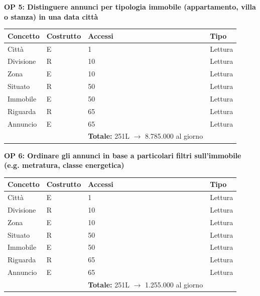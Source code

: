 \documentclass[a4paper,12pt]{report}
\begin{document}
            \textbf{OP 5: Distinguere annunci per tipologia immobile (appartamento, villa o stanza) in una data città}
        	\begin{table}[H]
            \centering
             \begin{tabular}{llll}
             \rowcolor{yellow!20} \textbf{Concetto} & \textbf{Costrutto} & \textbf{Accessi} & \textbf{Tipo}\\ [0.5ex] 
             \hline
             Città & E & 1 & Lettura \\ 
             Divisione & R & 10 & Lettura \\ 
             Zona & E & 10 & Lettura \\ 
             Situato & R & 50 & Lettura \\ 
             Immobile & E & 50 & Lettura \\
             Riguarda & R & 65 & Lettura \\ 
             Annuncio & E & 65 & Lettura \\ 
             \hline
                \rowcolor{yellow!20} &   & \textbf{Totale:} 251L $\rightarrow$ 8.785.000 al giorno &  \\ [1ex] 
             
             \end{tabular}
            \end{table}

            \textbf{OP 6: Ordinare gli annunci in base a particolari filtri sull'immobile (e.g. metratura, classe energetica)}
        	\begin{table}[H]
            \centering
             \begin{tabular}{llll}
             \rowcolor{yellow!20} \textbf{Concetto} & \textbf{Costrutto} & \textbf{Accessi} & \textbf{Tipo}\\ [0.5ex] 
             \hline
             Città & E & 1 & Lettura \\ 
             Divisione & R & 10 & Lettura \\ 
             Zona & E & 10 & Lettura \\ 
             Situato & R & 50 & Lettura \\ 
             Immobile & E & 50 & Lettura \\
             Riguarda & R & 65 & Lettura \\ 
             Annuncio & E & 65 & Lettura \\ 
             \hline
                \rowcolor{yellow!20} &   & \textbf{Totale:} 251L $\rightarrow$ 1.255.000 al giorno &  \\ [1ex] 
             
             \end{tabular}
            \end{table}
\end{document}
